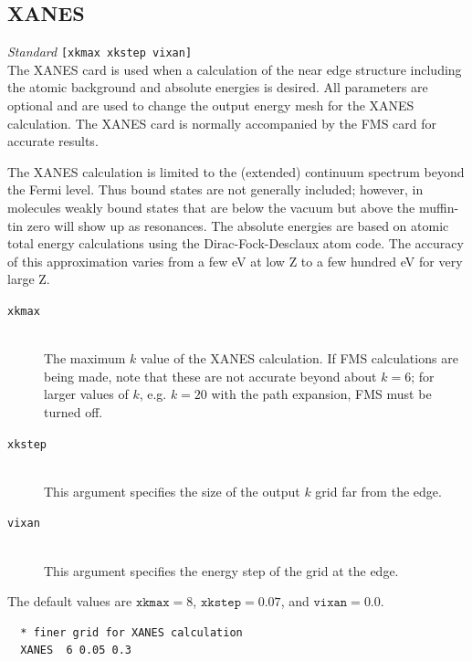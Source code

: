 \documentclass[11pt,oneside]{report} %
\renewcommand{\htmlref}[2]{\hyperlink{#2}{#1}}
\newenvironment{Card}[4]%
      {\vspace{3ex}%
        \subsection{#1}
        \quad\textsl{#3}\newline
        \quad\texttt{#2}\newline%
        \label{card:#4}\\}
      {}
\renewcommand{\htmlref}[2]{{#1}} %
\begin{document}
\begin{Card}{XANES}{[xkmax xkstep vixan]}{Standard}{xan}
  The XANES card is used when a calculation of the near edge structure
  including the atomic background and absolute energies is desired. All 
  parameters are optional and are used to change the output energy mesh
  for the XANES calculation. The XANES card is normally accompanied by the \htmlref{FMS}{card:fms} card for accurate results.

  The XANES calculation is limited to the (extended) continuum
  spectrum beyond the Fermi level. Thus bound states are not generally
  included; however, in molecules weakly bound states that are below the
  vacuum but above the muffin-tin zero will show up as resonances. The
  absolute energies are based on atomic total energy calculations using 
  the Dirac-Fock-Desclaux atom code. The accuracy of this approximation
  varies from a few eV at low Z to a few hundred eV for very large Z. 

\begin{description}
\item[\texttt{xkmax}]\hfill\\
   The maximum $k$ value of the XANES calculation. If FMS calculations are 
  being made, note that these are not accurate beyond about $k=6$; for 
  larger values of $k$, e.g. $k=20$ with the path expansion, FMS must be 
  turned off. 
\item[\texttt{xkstep}]\hfill\\
  This argument specifies the size of the output $k$ grid far from the edge. 
\item[\texttt{vixan}]\hfill\\
  This argument specifies the energy step of the grid at the edge. 
\end{description}  
  The default values are $\mathtt{xkmax}=8$, $\mathtt{xkstep}=0.07$, and
  $\mathtt{vixan}=0.0$.

\begin{verbatim}
  * finer grid for XANES calculation
  XANES  6 0.05 0.3
\end{verbatim}
\end{Card}
\end{document}
